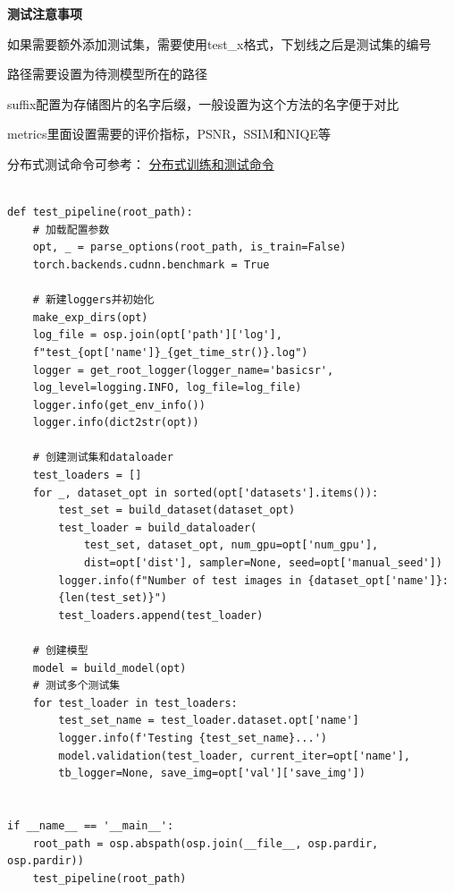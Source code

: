 \documentclass[../main.tex]{subfiles}
\begin{document}
\begin{hl} %

    \textbf{测试注意事项}

    如果需要额外添加测试集，需要使用test\_x格式，下划线之后是测试集的编号

    路径需要设置为待测模型所在的路径

    suffix配置为存储图片的名字后缀，一般设置为这个方法的名字便于对比

    metrics里面设置需要的评价指标，PSNR，SSIM和NIQE等

    分布式测试命令可参考：
    \href{https://github.com/XPixelGroup/BasicSR/blob/master/docs/TrainTest.md}{分布式训练和测试命令}

\end{hl}





\begin{verbatim}

def test_pipeline(root_path):
    # 加载配置参数
    opt, _ = parse_options(root_path, is_train=False)
    torch.backends.cudnn.benchmark = True

    # 新建loggers并初始化
    make_exp_dirs(opt)
    log_file = osp.join(opt['path']['log'],
    f"test_{opt['name']}_{get_time_str()}.log")
    logger = get_root_logger(logger_name='basicsr',
    log_level=logging.INFO, log_file=log_file)
    logger.info(get_env_info())
    logger.info(dict2str(opt))

    # 创建测试集和dataloader
    test_loaders = []
    for _, dataset_opt in sorted(opt['datasets'].items()):
        test_set = build_dataset(dataset_opt)
        test_loader = build_dataloader(
            test_set, dataset_opt, num_gpu=opt['num_gpu'],
            dist=opt['dist'], sampler=None, seed=opt['manual_seed'])
        logger.info(f"Number of test images in {dataset_opt['name']}:
        {len(test_set)}")
        test_loaders.append(test_loader)

    # 创建模型
    model = build_model(opt)
    # 测试多个测试集
    for test_loader in test_loaders:
        test_set_name = test_loader.dataset.opt['name']
        logger.info(f'Testing {test_set_name}...')
        model.validation(test_loader, current_iter=opt['name'],
        tb_logger=None, save_img=opt['val']['save_img'])


if __name__ == '__main__':
    root_path = osp.abspath(osp.join(__file__, osp.pardir, osp.pardir))
    test_pipeline(root_path)
\end{verbatim}
\end{document}
